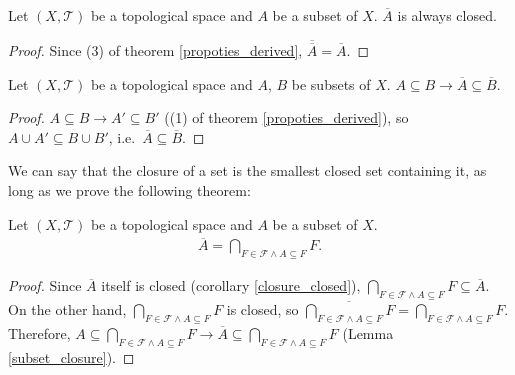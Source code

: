 \documentclass[openany]{book}
\begin{document}
\begin{corollary}\label{closure_closed}
Let $(X,\mathscr T)$ be a topological space and $A$ be a subset of $X$. 
$\overline A$ is always closed.
\end{corollary}
\begin{proof}
Since (3) of theorem \ref{propoties_derived}, $\overline{\overline A} = \overline A$.
\end{proof}

\begin{lemma}\label{subset_closure}
Let $(X,\mathscr T)$ be a topological space and $A$, $B$ be subsets of $X$.
$A\subseteq B \to \overline A\subseteq \overline B$.
\end{lemma}
\begin{proof}
$A\subseteq B \to A'\subseteq B'$ ((1) of theorem \ref{propoties_derived}), so $A\cup A'\subseteq B\cup B'$, i.e.\ $\overline A\subseteq \overline B$.
\end{proof}

We can say that the closure of a set is the smallest closed set containing it, as long as we prove the following theorem:

\begin{theorem}
Let $(X,\mathscr T)$ be a topological space and $A$ be a subset of $X$.
\begin{align*}
	\overline A = \bigcap_{F\in \mathscr F \wedge A\subseteq F} F.
\end{align*}
\end{theorem}
\begin{proof}
Since $\overline A$ itself is closed (corollary \ref{closure_closed}), $\bigcap_{F\in \mathscr F \wedge A\subseteq F} F \subseteq \overline A$. 
On the other hand, $\bigcap_{F\in \mathscr F \wedge A\subseteq F} F$ is closed, so $\overline{\bigcap_{F\in \mathscr F \wedge A\subseteq F} F} = \bigcap_{F\in \mathscr F \wedge A\subseteq F} F$.
Therefore, $A\subseteq \bigcap_{F\in \mathscr F \wedge A\subseteq F} F \to \overline A \subseteq \bigcap_{F\in \mathscr F \wedge A\subseteq F} F$ (Lemma \ref{subset_closure}). 
\end{proof}
\end{document}
